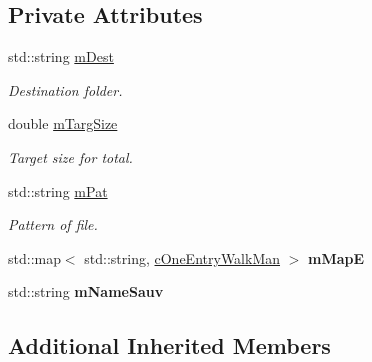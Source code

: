 \subsection*{Private Attributes}
\begin{DoxyCompactItemize}
\item 
std\+::string \hyperlink{classMMVII_1_1cAppli__Walkman_aad4ef985e08e4efc7c346876acef3720}{m\+Dest}\hypertarget{classMMVII_1_1cAppli__Walkman_aad4ef985e08e4efc7c346876acef3720}{}\label{classMMVII_1_1cAppli__Walkman_aad4ef985e08e4efc7c346876acef3720}

\begin{DoxyCompactList}\small\item\em Destination folder. \end{DoxyCompactList}\item 
double \hyperlink{classMMVII_1_1cAppli__Walkman_afec6deef33313e1ce3eef4ae54d7c806}{m\+Targ\+Size}\hypertarget{classMMVII_1_1cAppli__Walkman_afec6deef33313e1ce3eef4ae54d7c806}{}\label{classMMVII_1_1cAppli__Walkman_afec6deef33313e1ce3eef4ae54d7c806}

\begin{DoxyCompactList}\small\item\em Target size for total. \end{DoxyCompactList}\item 
std\+::string \hyperlink{classMMVII_1_1cAppli__Walkman_a69112e0805ed3186de8f1841ab77f234}{m\+Pat}\hypertarget{classMMVII_1_1cAppli__Walkman_a69112e0805ed3186de8f1841ab77f234}{}\label{classMMVII_1_1cAppli__Walkman_a69112e0805ed3186de8f1841ab77f234}

\begin{DoxyCompactList}\small\item\em Pattern of file. \end{DoxyCompactList}\item 
std\+::map$<$ std\+::string, \hyperlink{classMMVII_1_1cOneEntryWalkMan}{c\+One\+Entry\+Walk\+Man} $>$ {\bfseries m\+MapE}\hypertarget{classMMVII_1_1cAppli__Walkman_a2ed6a195dd01ece15da0ca4c40a8c70e}{}\label{classMMVII_1_1cAppli__Walkman_a2ed6a195dd01ece15da0ca4c40a8c70e}

\item 
std\+::string {\bfseries m\+Name\+Sauv}\hypertarget{classMMVII_1_1cAppli__Walkman_a1fc52cd5a5b8077073ae6574fbb1e464}{}\label{classMMVII_1_1cAppli__Walkman_a1fc52cd5a5b8077073ae6574fbb1e464}

\end{DoxyCompactItemize}
\subsection*{Additional Inherited Members}


